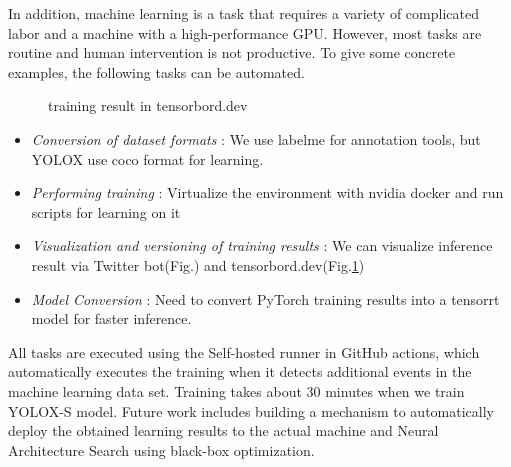 \documentclass[lettersize,journal]{IEEEtran}
\begin{document}
In addition, machine learning is a task that requires a variety of complicated labor and a machine with a high-performance GPU.
However, most tasks are routine and human intervention is not productive.
To give some concrete examples, the following tasks can be automated.

\begin{figure}[htbp]
    \begin{center}
  \end{center}
  \caption{training result in tensorbord.dev}
  \label{fig:tensorbord}
\end{figure}

\begin{itemize}
    \item {\it Conversion of dataset formats }:
        We use labelme for annotation tools, but YOLOX use coco format for learning.
    \item {\it Performing training }:
        Virtualize the environment with nvidia docker and run scripts for learning on it
    \item {\it Visualization and versioning of training results }:
        We can visualize inference result via Twitter bot(Fig.\cite{wam_v_tan_bot}) and tensorbord.dev(Fig.\ref{fig:tensorbord})
    \item {\it Model Conversion }:
        Need to convert PyTorch training results into a tensorrt model for faster inference.
\end{itemize}

All tasks are executed using the Self-hosted runner in GitHub actions, 
which automatically executes the training when it detects additional events in the machine learning data set.
Training takes about 30 minutes when we train YOLOX-S model.
Future work includes building a mechanism to automatically deploy the obtained learning results to 
the actual machine and Neural Architecture Search using black-box optimization.
\end{document}

